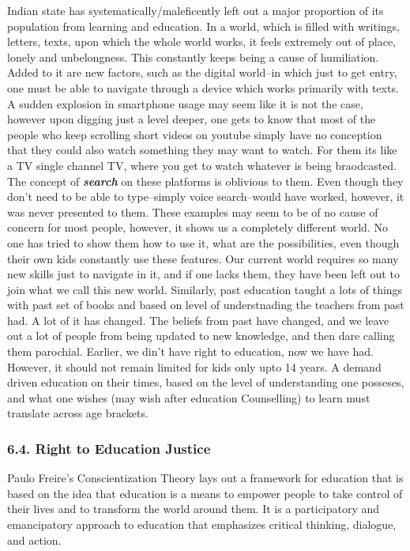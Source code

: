 Indian state has systematically/maleficently left out a major proportion
of its population from learning and education. In a world, which is
filled with writings, letters, texts, upon which the whole world works,
it feels extremely out of place, lonely and unbelongness. This
constantly keeps being a cause of humiliation. Added to it are new
factors, such as the digital world--in which just to get entry, one must
be able to navigate through a device which works primarily with texts. A
sudden explosion in smartphone usage may seem like it is not the case,
however upon digging just a level deeper, one gets to know that most of
the people who keep scrolling short videos on youtube simply have no
conception that they could also watch something they may want to watch.
For them its like a TV single channel TV, where you get to watch
whatever is being braodcasted. The concept of \textbf{\emph{search}} on
these platforms is oblivious to them. Even though they don't need to be
able to type--simply voice search--would have worked, however, it was
never presented to them. These examples may seem to be of no cause of
concern for most people, however, it shows us a completely different
world. No one has tried to show them how to use it, what are the
possibilities, even though their own kids constantly use these features.
Our current world requires so many new skills just to navigate in it,
and if one lacks them, they have been left out to join what we call this
new world. Similarly, past education taught a lots of things with past
set of books and based on level of understnading the teachers from past
had. A lot of it has changed. The beliefs from past have changed, and we
leave out a lot of people from being updated to new knowledge, and then
dare calling them parochial. Earlier, we din't have right to education,
now we have had. However, it should not remain limited for kids only
upto 14 years. A demand driven education on their times, based on the
level of understanding one posseses, and what one wishes (may wish after
education Counselling) to learn must translate across age brackets.

\subsubsection{6.4. Right to Education
Justice}\label{right-to-education-justice}

Paulo Freire's Conscientization Theory lays out a framework for
education that is based on the idea that education is a means to empower
people to take control of their lives and to transform the world around
them. It is a participatory and emancipatory approach to education that
emphasizes critical thinking, dialogue, and action.

